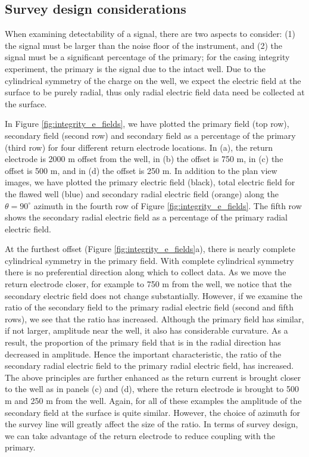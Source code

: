\documentclass[extra,mreferee]{gji}
\begin{document}
\subsection{Survey design considerations}

When examining detectability of a signal, there are two aspects to consider: (1) the signal must be larger than the noise floor of the instrument, and (2) the signal must be a significant percentage of the primary; for the casing integrity experiment, the primary is the signal due to the intact well. Due to the cylindrical symmetry of the charge on the well, we expect the electric field at the surface to be purely radial, thus only radial electric field data need be collected at the surface.

In Figure \ref{fig:integrity_e_fields}, we have plotted the primary field (top row), secondary field (second row) and secondary field as a percentage of the primary (third row) for four different return electrode locations. In (a), the return electrode is 2000 m offset from the well, in (b) the offset is 750 m, in (c) the offset is 500 m, and in (d) the offset is 250 m. In addition to the plan view images, we have plotted the primary electric field (black),  total electric field for the flawed well (blue) and secondary radial electric field (orange) along the $\theta = 90^\circ$ azimuth in the fourth row of Figure \ref{fig:integrity_e_fields}. The fifth row shows the secondary radial electric field as a percentage of the primary radial electric field.






At the furthest offset (Figure \ref{fig:integrity_e_fields}a), there is nearly complete cylindrical symmetry in the primary field. With complete cylindrical symmetry there is no preferential direction along which to collect data. As we move the return electrode closer, for example to 750 m from the well, we notice that the secondary electric field does not change substantially. However, if we examine the ratio of the secondary field to the primary radial electric field (second and fifth rows), we see that the ratio has increased. Although the primary field has similar, if not larger, amplitude near the well, it also has considerable curvature. As a result, the proportion of the primary field that is in the radial direction has decreased in amplitude. Hence the important characteristic, the ratio of the secondary radial electric field to the primary radial electric field, has increased. The above principles are further enhanced as the return current is brought closer to the well as in panels (c) and (d), where the return electrode is brought to 500 m and 250 m from the well.  Again, for all of these examples the amplitude of the secondary field at the surface is quite similar. However, the choice of azimuth for the survey line will greatly affect the size of the ratio. In terms of survey design, we can take advantage of the return electrode to reduce coupling with the primary.
\end{document}
